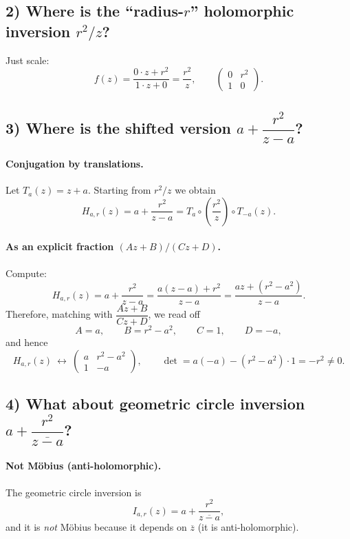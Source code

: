 \begin{problem}[CP-IV-0069]
	\subsection*{\textbf{2) Where is the “radius-$r$” holomorphic inversion $r^{2}/z$?}}
	Just scale:
	\[
	f(z)=\frac{0\cdot z+r^{2}}{1\cdot z+0}=\frac{r^{2}}{z},
	\qquad
	\begin{pmatrix}0 & r^{2}\\ 1 & 0\end{pmatrix}.
	\]

	\subsection*{\textbf{3) Where is the shifted version $a+\dfrac{r^{2}}{z-a}$?}}

	\paragraph{\textbf{Conjugation by translations.}}
	Let $T_a(z)=z+a$. Starting from $r^{2}/z$ we obtain
	\[
	H_{a,r}(z)=a+\frac{r^{2}}{z-a}
	= T_a\circ\left(\frac{r^{2}}{z}\right)\circ T_{-a}(z).
	\]

	\paragraph{\textbf{As an explicit fraction $(Az+B)/(Cz+D)$.}}
	Compute:
	\[
	H_{a,r}(z)=a+\frac{r^{2}}{z-a}
	=\frac{a(z-a)+r^{2}}{z-a}
	=\frac{az+(r^{2}-a^{2})}{z-a}.
	\]
	Therefore, matching with $\dfrac{Az+B}{Cz+D}$, we read off
	\[
	A=a,\qquad B=r^{2}-a^{2},\qquad C=1,\qquad D=-a,
	\]
	and hence
	\[
	H_{a,r}(z)\ \longleftrightarrow\
	\begin{pmatrix}
		a & r^{2}-a^{2}\\[2pt]
		1 & -a
	\end{pmatrix},
	\qquad
	\det=
	a(-a)-(r^{2}-a^{2})\cdot 1=-r^{2}\neq 0.
	\]

	\subsection*{\textbf{4) What about geometric circle inversion $a+\dfrac{r^{2}}{\overline{z-a}}$?}}

	\paragraph{\textbf{Not Möbius (anti-holomorphic).}}
	The geometric circle inversion is
	\[
	I_{a,r}(z)=a+\frac{r^{2}}{\overline{z-a}},
	\]
	and it is \emph{not} Möbius because it depends on $\overline{z}$ (it is anti-holomorphic).


\end{problem}
